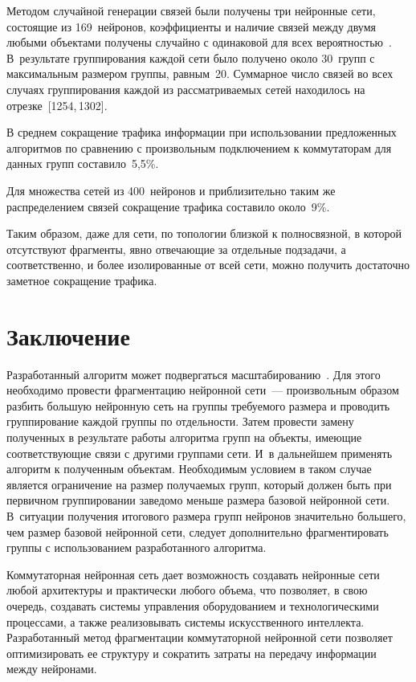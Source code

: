\begin{multicols}{2}
     Методом случайной генерации связей были получены три нейронные 
сети, состоящие из 169~нейронов, коэффициенты и наличие связей между\linebreak 
двумя любыми объектами получены случайно с одинаковой для всех 
вероятностью~\cite{10step}. В~результате группирования каждой сети было 
получено около 30~групп с максимальным размером группы, равным~20. 
Суммарное число связей во всех случаях группирования каждой из 
рассматриваемых сетей находилось на отрезке~[1254,\,1302].


     В среднем сокращение трафика информации при использовании 
предложенных алгоритмов по сравнению с произвольным подключением к 
коммутаторам для данных групп составило~5,5\%.
     
     Для множества сетей из 400~нейронов и приблизительно таким же 
распределением связей сокращение трафика составило около~9\%.
     
     Таким образом, даже для сети, по топологии близкой к полносвязной, в 
которой отсутствуют фрагменты, явно отвечающие за отдельные подзадачи, 
а соответственно, и более изолированные от всей сети, можно получить 
достаточно заметное сокращение трафика.

\vspace*{-3pt}
\section{Заключение}
\vspace*{-1pt}


     Разработанный алгоритм может подвергаться 
масштабированию~\cite{11step}. Для этого необходимо провести 
фрагментацию нейронной сети~---  произвольным образом разбить большую 
нейронную сеть на группы требуемого размера и проводить группирование 
каждой группы по отдельности. Затем провести замену полученных в 
результате работы алгоритма групп на объекты, имеющие соответствующие 
связи с другими группами сети. И~в дальнейшем применять алгоритм к 
полученным объектам. Необходимым условием в таком случае является 
ограничение на размер получаемых групп, который должен быть при 
первичном группировании заведомо меньше размера базовой нейронной 
сети. В~ситуации получения итогового размера групп нейронов значительно 
большего, чем размер базовой нейронной сети, следует дополнительно 
фрагментировать группы с использованием разработанного алгоритма.
     
     Коммутаторная нейронная сеть дает возможность создавать нейронные 
сети любой архитектуры и практически любого объема, что позволяет, в 
свою очередь, создавать системы управления оборудованием и 
технологическими процессами, а также реализовывать системы 
искусственного интеллекта. Разработанный метод фрагментации 
коммутаторной нейронной сети позволяет оптимизировать ее структуру и 
сократить затраты на передачу информации между нейронами.


\end{multicols}
